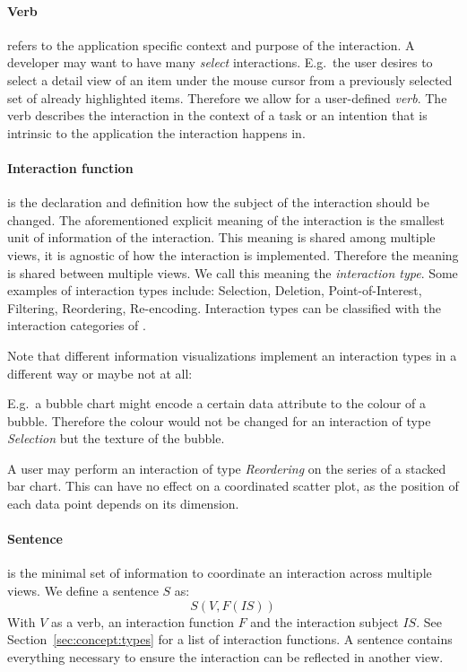 \paragraph{Verb} refers to the application specific context and purpose of the interaction.
A developer may want to have many \emph{select} interactions.
E.g.\ the user desires to select a detail view of an item under the mouse cursor from a previously selected set of already highlighted items.
Therefore we allow for a user-defined \emph{verb}.
The verb describes the interaction in the context of a task or an intention that is intrinsic to the application the interaction happens in.

\paragraph{Interaction function} is the declaration and definition how the subject of the interaction should be changed.
The aforementioned explicit meaning of the interaction is the smallest unit of information of the interaction.
This meaning is shared among multiple views, it is agnostic of how the interaction is implemented.
Therefore the meaning is shared between multiple views.
We call this meaning the \emph{interaction type}.
Some examples of interaction types include: Selection, Deletion, Point-of-Interest, Filtering, Reordering, Re-encoding.
Interaction types can be classified with the interaction categories of \textcite{Yi2007}.

Note that different information visualizations implement an interaction types in a different way or maybe not at all:

E.g.\ a bubble chart might encode a certain data attribute to the colour of a bubble.
Therefore the colour would not be changed for an interaction of type \emph{Selection} but the texture of the bubble.

A user may perform an interaction of type \emph{Reordering} on the series of a stacked bar chart.
This can have no effect on a coordinated scatter plot, as the position of each data point depends on its dimension.

\paragraph{Sentence} is the minimal set of information to coordinate an interaction across multiple views.
We define a sentence $S$ as:
\begin{equation}
    S(V, F(IS))
\end{equation}
With $V$ as a verb, an interaction function $F$ and the interaction subject $IS$.
See Section~\ref{sec:concept:types} for a list of interaction functions.
A sentence contains everything necessary to ensure the interaction can be reflected in another view.

